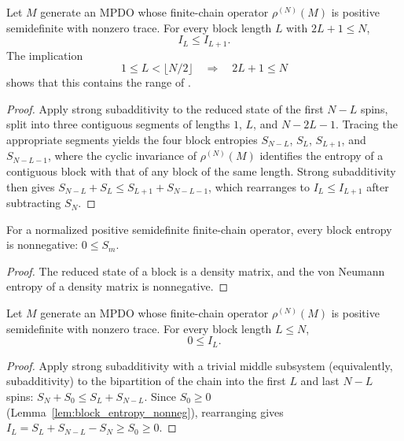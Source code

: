 \begin{proposition}
    \label{prop:mutual_info_monotone}
    \leanok
    Let $M$ generate an MPDO whose finite-chain operator $\rho^{(N)}(M)$ is
    positive semidefinite with nonzero trace. For every block length $L$ with
    $2L+1\le N$,
    \[
        I_L \le I_{L+1}.
    \]
    The implication
    \[
        1\le L<\lfloor N/2\rfloor \quad\Longrightarrow\quad 2L+1\le N
    \]
    shows that this contains the range of
    \cite[Proposition~4.5, line~801]{Cirac2016MPDO_arXiv}.
\end{proposition}
\begin{proof}\leanok
    Apply strong subadditivity to the reduced state of the first $N-L$ spins,
    split into three contiguous segments of lengths $1$, $L$, and $N-2L-1$.
    Tracing the appropriate segments yields the four block entropies
    $S_{N-L}$, $S_L$, $S_{L+1}$, and $S_{N-L-1}$, where the cyclic invariance of
    $\rho^{(N)}(M)$ identifies the entropy of a contiguous block with that of any
    block of the same length. Strong subadditivity then gives
    $S_{N-L} + S_L \le S_{L+1} + S_{N-L-1}$, which rearranges to
    $I_L \le I_{L+1}$ after subtracting $S_N$.
\end{proof}

\begin{lemma}
    \label{lem:block_entropy_nonneg}
    \leanok
    For a normalized positive semidefinite finite-chain operator, every block entropy
    is nonnegative: $0 \le S_m$.
\end{lemma}
\begin{proof}\leanok
    The reduced state of a block is a density matrix, and the von Neumann entropy of
    a density matrix is nonnegative.
\end{proof}

\begin{lemma}
    \label{lem:mutual_info_chain_nonneg}
    \leanok
    Let $M$ generate an MPDO whose finite-chain operator $\rho^{(N)}(M)$ is positive
    semidefinite with nonzero trace. For every block length $L\le N$,
    \[
        0 \le I_L.
    \]
\end{lemma}
\begin{proof}\leanok
    Apply strong subadditivity with a trivial middle subsystem (equivalently,
    subadditivity) to the bipartition of the chain into the first $L$ and last
    $N-L$ spins: $S_N + S_0 \le S_L + S_{N-L}$. Since $S_0 \ge 0$
    (Lemma~\ref{lem:block_entropy_nonneg}), rearranging gives
    $I_L = S_L + S_{N-L} - S_N \ge S_0 \ge 0$.
\end{proof}

